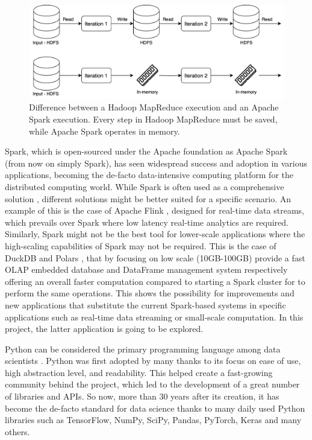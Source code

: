 \begin{figure}[!ht]
    \begin{center}
      \includegraphics[width=\textwidth]{figures/1-introduction/Spark_MapReduce.png}
    \end{center}
    \caption{Difference between a Hadoop MapReduce execution and an Apache Spark execution. Every step in Hadoop MapReduce must be saved, while Apache Spark operates in memory.}
    \label{fig:MapReducevsSpark}
\end{figure}


Spark, which is open-sourced under the Apache foundation as Apache Spark \cite{ApacheSparkUnified} (from now on simply Spark), has seen widespread success and adoption in various applications, becoming the de-facto data-intensive computing platform for the distributed computing world. While Spark is often used as a comprehensive solution \cite{zahariaApacheSparkUnified2016}, different solutions might be better suited for a specific scenario. An example of this is the case of Apache Flink \cite{carboneApacheFlinkStream}, designed for real-time data streams, which prevails over Spark where low latency real-time analytics are required. Similarly, Spark might not be the best tool for lower-scale applications where the high-scaling capabilities of Spark may not be required. This is the case of DuckDB \cite{raasveldtDuckDBEmbeddableAnalytical2019} and Polars \cite{vinkWroteOneFastest2021}, that by focusing on low scale (10GB-100GB) provide a fast \gls{OLAP} embedded database and DataFrame management system respectively offering an overall faster computation compared to starting a Spark cluster for to perform the same operations. This shows the possibility for improvements and new applications that substitute the current Spark-based systems in specific applications such as real-time data streaming or small-scale computation. In this project, the latter application is going to be explored.

Python can be considered the primary programming language among data scientists \cite{Python_CS-R9526}. Python was first adopted by many thanks to its focus on ease of use, high abstraction level, and readability. This helped create a fast-growing community behind the project, which led to the development of a great number of libraries and \glspl{API}. So now, more than 30 years after its creation, it has become the de-facto standard for data science thanks to many daily used Python libraries such as TensorFlow, NumPy, SciPy, Pandas, PyTorch, Keras and many others.


